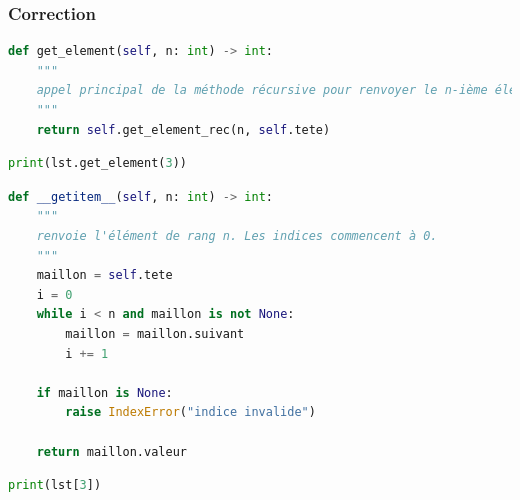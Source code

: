 \documentclass[svgnames,11pt]{beamer}
\begin{document}
\begin{frame}[fragile]
    \frametitle{Correction}

    \begin{center}
    \begin{lstlisting}[language=Python , basicstyle=\ttfamily\small, xleftmargin=1em, xrightmargin=1em]
def get_element(self, n: int) -> int:
    """
    appel principal de la méthode récursive pour renvoyer le n-ième élément
    """
    return self.get_element_rec(n, self.tete)
\end{lstlisting}
    \end{center}
    \begin{center}
        \begin{lstlisting}[language=Python , basicstyle=\ttfamily\small, xleftmargin=2em, xrightmargin=2em]
print(lst.get_element(3))
\end{lstlisting}
        \label{CODE}
    \end{center}
\end{frame}
\begin{frame}[fragile]
    \begin{center}
    \begin{lstlisting}[language=Python , basicstyle=\ttfamily\small, xleftmargin=2em, xrightmargin=2em]
def __getitem__(self, n: int) -> int:
    """
    renvoie l'élément de rang n. Les indices commencent à 0.
    """
    maillon = self.tete
    i = 0
    while i < n and maillon is not None:
        maillon = maillon.suivant
        i += 1

    if maillon is None:
        raise IndexError("indice invalide")

    return maillon.valeur
\end{lstlisting}
    \end{center}
    \begin{center}
        \begin{lstlisting}[language=Python , basicstyle=\ttfamily\small, xleftmargin=2em, xrightmargin=2em]
print(lst[3])
\end{lstlisting}
        \label{CODE}
    \end{center}
\end{frame}
\end{document}
